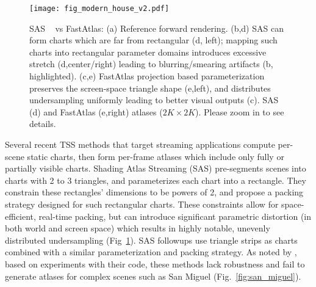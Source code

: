 \begin{figure}
\texttt{[image: fig\_modern\_house\_v2.pdf]}
\caption{SAS ~\cite{mueller2018shading} vs FastAtlas:  (a) Reference forward rendering. (b,d) SAS can form charts which are far from rectangular (d, left); mapping such charts into rectangular parameter domains introduces excessive stretch (d,center/right) leading to blurring/smearing artifacts (b, highlighted). (c,e) FastAtlas projection based parameterization preserves the screen-space triangle shape (e,left), and distributes undersampling uniformly leading to better visual outputs (c).  SAS (d) and FastAtlas (e,right) atlases ($2K \times 2K$). Please zoom in to see details.}
\label{fig:sas_issues}
\vspace{-5mm}
\end{figure}

Several recent TSS methods that target streaming applications \cite{mueller2018shading,hladky2019tessellated,hladky2021snakebinning,Neff2022MSA} compute per-scene static charts, then form per-frame atlases which include only fully or partially visible charts. Shading Atlas Streaming (SAS) \cite{mueller2018shading} pre-segments scenes into charts with 2 to 3 triangles, and parameterizes each chart into a rectangle. They constrain these rectangles' dimensions to be powers of 2, and propose a packing strategy designed for such rectangular charts. These constraints allow for space-efficient, real-time packing, but can introduce significant parametric distortion (in both world and screen space) which results in highly notable, unevenly distributed  undersampling (Fig~\ref{fig:sas_issues}). SAS followups use triangle strips as charts \cite{hladky2019tessellated,hladky2021snakebinning} combined with a similar parameterization and packing strategy. As noted by \cite{hladky2022quadstream}, based on experiments with their code, these methods lack robustness and fail to generate atlases for complex scenes such as San Miguel (Fig.~\ref{fig:san_miguel}). 


